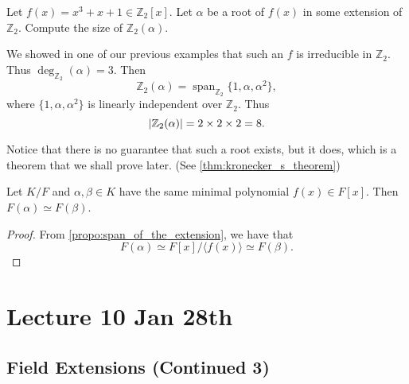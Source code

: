 \documentclass[notoc,notitlepage,nobib]{tufte-book}
\DeclareMathOperator{\Span}{span}
\begin{document}
\begin{eg}
  Let $f(x) = x^3 + x + 1 \in \mathbb{Z}_2[x]$. Let $\alpha$ be a root of $f(x)$ in some extension of
  $\mathbb{Z}_2$. Compute the size of $\mathbb{Z}_2(\alpha)$.
\end{eg}

\begin{solution}
  We showed in one of our previous examples that such an $f$ is irreducible in $\mathbb{Z}_2$. Thus
  $\deg_{\mathbb{Z}_2}(\alpha) = 3$. Then
  \begin{equation*}
    \mathbb{Z}_2(\alpha) = \Span_{\mathbb{Z}_2} \{ 1, \alpha, \alpha^2 \}, 
  \end{equation*}
  where $\{ 1, \alpha, \alpha^2 \}$ is linearly independent over $\mathbb{Z}_2$. Thus
  \begin{equation*}
    \left|\mathbb{Z}_2(\alpha)\right| = 2 \times 2 \times 2 = 8.
  \end{equation*}
\end{solution}

\begin{note}
  Notice that there is no guarantee that such a root exists, but it does, which is a theorem that we shall
  prove later. (See \cref{thm:kronecker_s_theorem})
\end{note}

\begin{crly}\label{crly:isomorphism_between_extensions}
  Let $K / F$ and $\alpha, \beta \in K$ have the same minimal polynomial $f(x) \in F[x]$. Then
  $F(\alpha) \simeq F(\beta)$.
\end{crly}

\begin{proof}
  From \cref{propo:span_of_the_extension}, we have that
  \begin{equation*}
    F(\alpha) \simeq F[x] / \langle f(x) \rangle \simeq F(\beta).
  \end{equation*}
\end{proof}



\chapter{Lecture 10 Jan 28th}%
\label{chp:lecture_10_jan_28th}

\section{Field Extensions (Continued 3)}%
\label{sec:field_extensions_continued_3}
\end{document}
